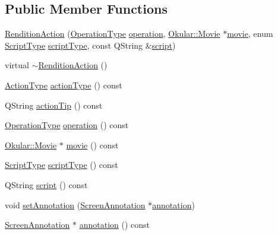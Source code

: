 \subsection*{Public Member Functions}
\begin{DoxyCompactItemize}
\item 
\hyperlink{classOkular_1_1RenditionAction_ab2bef031b4190b9bc0a3ab8196995733}{Rendition\+Action} (\hyperlink{classOkular_1_1RenditionAction_ae036a78aa4d9997df70e856410cbc1a5}{Operation\+Type} \hyperlink{classOkular_1_1RenditionAction_a3dc5c1ed8fae1f1206db7a7fcc30eb64}{operation}, \hyperlink{classOkular_1_1Movie}{Okular\+::\+Movie} $\ast$\hyperlink{classOkular_1_1RenditionAction_a42a9f31af60ad5647a5784f40dedd406}{movie}, enum \hyperlink{namespaceOkular_a061f34ff835b2d2142fef28bcfd09325}{Script\+Type} \hyperlink{classOkular_1_1RenditionAction_a66495366865408d8c8c10122186f7fdd}{script\+Type}, const Q\+String \&\hyperlink{classOkular_1_1RenditionAction_aa417843d31585700a4b1d68803ddffb0}{script})
\item 
virtual \hyperlink{classOkular_1_1RenditionAction_a59a8924fe97f1b8574667a0a59def2c9}{$\sim$\+Rendition\+Action} ()
\item 
\hyperlink{classOkular_1_1Action_abe474735af30ea76105595533df9ec47}{Action\+Type} \hyperlink{classOkular_1_1RenditionAction_a4504e129022b92d1a7788888206f8fd0}{action\+Type} () const 
\item 
Q\+String \hyperlink{classOkular_1_1RenditionAction_a6a4d1c45ec9832dad5b8ceadc56ec393}{action\+Tip} () const 
\item 
\hyperlink{classOkular_1_1RenditionAction_ae036a78aa4d9997df70e856410cbc1a5}{Operation\+Type} \hyperlink{classOkular_1_1RenditionAction_a3dc5c1ed8fae1f1206db7a7fcc30eb64}{operation} () const 
\item 
\hyperlink{classOkular_1_1Movie}{Okular\+::\+Movie} $\ast$ \hyperlink{classOkular_1_1RenditionAction_a42a9f31af60ad5647a5784f40dedd406}{movie} () const 
\item 
\hyperlink{namespaceOkular_a061f34ff835b2d2142fef28bcfd09325}{Script\+Type} \hyperlink{classOkular_1_1RenditionAction_a66495366865408d8c8c10122186f7fdd}{script\+Type} () const 
\item 
Q\+String \hyperlink{classOkular_1_1RenditionAction_aa417843d31585700a4b1d68803ddffb0}{script} () const 
\item 
void \hyperlink{classOkular_1_1RenditionAction_a7e4fd7579b6fb9882409a8f9ddb234c2}{set\+Annotation} (\hyperlink{classOkular_1_1ScreenAnnotation}{Screen\+Annotation} $\ast$\hyperlink{classOkular_1_1RenditionAction_abeb88c54cdac10eb5c4899cea234b6b3}{annotation})
\item 
\hyperlink{classOkular_1_1ScreenAnnotation}{Screen\+Annotation} $\ast$ \hyperlink{classOkular_1_1RenditionAction_abeb88c54cdac10eb5c4899cea234b6b3}{annotation} () const 
\end{DoxyCompactItemize}


